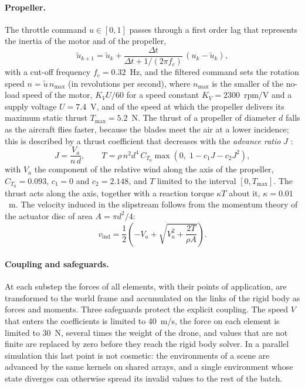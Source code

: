 \paragraph{Propeller.} The throttle command $u \in [0,1]$ passes through a first order lag that represents the inertia of the motor and of the propeller,
\begin{equation}
\tilde u_{k+1} = \tilde u_k + \frac{\Delta t}{\Delta t + 1/(2\pi f_c)}\,\left(u_k - \tilde u_k\right),
\label{eq:prop-lag}
\end{equation}
with a cut-off frequency $f_c = 0.32$~Hz, and the filtered command sets the rotation speed $n = \tilde u\, n_{\max}$ (in revolutions per second), where $n_{\max}$ is the smaller of the no-load speed of the motor, $K_V U / 60$ for a speed constant $K_V = 2300$~rpm/V and a supply voltage $U = 7.4$~V, and of the speed at which the propeller delivers its maximum static thrust $T_{\max} = 5.2$~N. The thrust of a propeller of diameter $d$ falls as the aircraft flies faster, because the blades meet the air at a lower incidence; this is described by a thrust coefficient that decreases with the \emph{advance ratio} $J$ \cite{mccormick1995aerodynamics}:
\begin{equation}
J = \frac{V_a}{n\, d}, \qquad T = \rho\, n^2 d^4\, C_{T_0} \max\!\left(0,\; 1 - c_1 J - c_2 J^2\right),
\label{eq:prop-thrust}
\end{equation}
with $V_a$ the component of the relative wind along the axis of the propeller, $C_{T_0} = 0.093$, $c_1 = 0$ and $c_2 = 2.148$, and $T$ limited to the interval $[0, T_{\max}]$. The thrust acts along the axis, together with a reaction torque $\kappa T$ about it, $\kappa = 0.01$~m. The velocity induced in the slipstream follows from the momentum theory of the actuator disc of area $A = \pi d^2/4$:
\begin{equation}
v_{\mathrm{ind}} = \frac{1}{2}\left( -V_a + \sqrt{V_a^2 + \frac{2T}{\rho A}} \right).
\label{eq:prop-induced}
\end{equation}

\paragraph{Coupling and safeguards.} At each substep the forces of all elements, with their points of application, are transformed to the world frame and accumulated on the links of the rigid body as forces and moments. Three safeguards protect the explicit coupling. The speed $V$ that enters the coefficients is limited to 40~m/s, the force on each element is limited to 30~N, several times the weight of the drone, and values that are not finite are replaced by zero before they reach the rigid body solver. In a parallel simulation this last point is not cosmetic: the environments of a scene are advanced by the same kernels on shared arrays, and a single environment whose state diverges can otherwise spread its invalid values to the rest of the batch.

